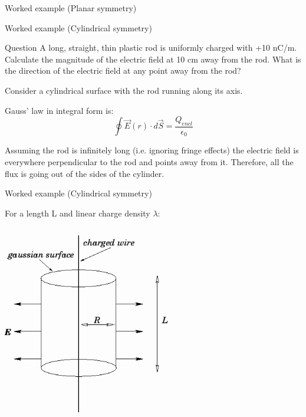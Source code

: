 {\begin{frame}{Worked example (Planar symmetry)}
\end{frame}


%
%

\begin{frame}{Worked example (Cylindrical symmetry)}

\begin{blockexmplque}{Question}
A long, straight, thin plastic rod is uniformly charged with +10 nC/m.
Calculate the magnitude of the electric field at 10 cm away from the rod.
What is the direction of the electric field at any point away from the rod?
\end{blockexmplque}
\vspace{0.4cm}

Consider a cylindrical surface with the rod running along its axis.\\
\vspace{0.2cm}

Gauss' law in integral form is:
\begin{equation*}
 \oint \vec{E}(r) \cdot d\vec{S} = \frac{Q_{encl}}{\epsilon_0}
\end{equation*}

Assuming the rod is infinitely long (i.e. ignoring fringe effects)
the electric field is everywhere perpendicular to the rod and points away from it.
Therefore, all the flux is going out of the sides of the cylinder.\\

\end{frame}

%
%
%

\begin{frame}{Worked example (Cylindrical symmetry)}

For a length L and linear charge density $\lambda$:

\begin{columns}
  \begin{column}{0.45\textwidth}
   \begin{center}
     \includegraphics[width=0.65\textwidth]{./images/problems/lect1_charged_rod.png}\\
   \end{center}
  \end{column}
  \begin{column}{0.55\textwidth}


\end{column}
\end{columns}
\end{frame}}
